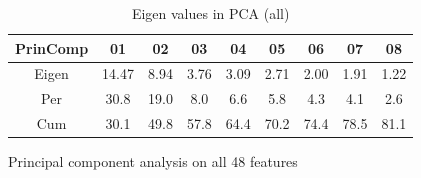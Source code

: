 \begin{table}[h!]
	\centering
	\begin{tabular}{|c|c|c|c|c|c|c|c|c|}
		\hline
		\textbf{PrinComp} & \textbf{01} & \textbf{02} & \textbf{03} & \textbf{04} & \textbf{05} & \textbf{06} & \textbf{07} & \textbf{08} \\
		\hline
		Eigen & 14.47 & 8.94 & 3.76 & 3.09 & 2.71 & 2.00 & 1.91 & 1.22 \\
		Per & 30.8 & 19.0 & 8.0 & 6.6 & 5.8 & 4.3 & 4.1 & 2.6 \\
		Cum & 30.1 & 49.8 & 57.8 & 64.4 & 70.2 & 74.4 & 78.5 & 81.1 \\
		\hline
	\end{tabular}
	\caption{Eigen values in PCA (all)}
	{\small Principal component analysis on all 48 features}
	\label{tab:eigen-values-all}
\end{table}

